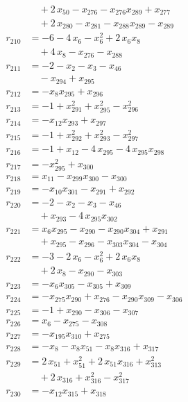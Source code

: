 \begin{align*}
&\quad{}+ 2\,x_{50} - x_{276} - x_{276} x_{289} + x_{277} \\
&\quad{}+ 2\,x_{280} - x_{281} - x_{288} x_{289} - x_{289} \\
r_{210} &= -6 - 4\,x_{6} - x_{6}^{2} + 2\,x_{6} x_{8} \\
&\quad{}+ 4\,x_{8} - x_{276} - x_{288} \\
r_{211} &= -2 - x_{2} - x_{3} - x_{46} \\
&\quad{}- x_{294} + x_{295} \\
r_{212} &= -x_{8} x_{295} + x_{296} \\
r_{213} &= -1 + x_{291}^{2} + x_{295}^{2} - x_{296}^{2} \\
r_{214} &= -x_{12} x_{293} + x_{297} \\
r_{215} &= -1 + x_{292}^{2} + x_{293}^{2} - x_{297}^{2} \\
r_{216} &= -1 + x_{12} - 4\,x_{295} - 4\,x_{295} x_{298} \\
r_{217} &= -x_{295}^{2} + x_{300} \\
r_{218} &= x_{11} - x_{299} x_{300} - x_{300} \\
r_{219} &= -x_{10} x_{301} - x_{291} + x_{292} \\
r_{220} &= -2 - x_{2} - x_{3} - x_{46} \\
&\quad{}+ x_{293} - 4\,x_{295} x_{302} \\
r_{221} &= x_{6} x_{295} - x_{290} - x_{290} x_{304} + x_{291} \\
&\quad{}+ x_{295} - x_{296} - x_{303} x_{304} - x_{304} \\
r_{222} &= -3 - 2\,x_{6} - x_{6}^{2} + 2\,x_{6} x_{8} \\
&\quad{}+ 2\,x_{8} - x_{290} - x_{303} \\
r_{223} &= -x_{6} x_{305} - x_{305} + x_{309} \\
r_{224} &= -x_{275} x_{290} + x_{276} - x_{290} x_{309} - x_{306} \\
r_{225} &= -1 + x_{290} - x_{306} - x_{307} \\
r_{226} &= x_{6} - x_{275} - x_{308} \\
r_{227} &= -x_{195} x_{310} + x_{275} \\
r_{228} &= -x_{8} - x_{8} x_{51} - x_{8} x_{316} + x_{317} \\
r_{229} &= 2\,x_{51} + x_{51}^{2} + 2\,x_{51} x_{316} + x_{313}^{2} \\
&\quad{}+ 2\,x_{316} + x_{316}^{2} - x_{317}^{2} \\
r_{230} &= -x_{12} x_{315} + x_{318} \\

\end{align*}

